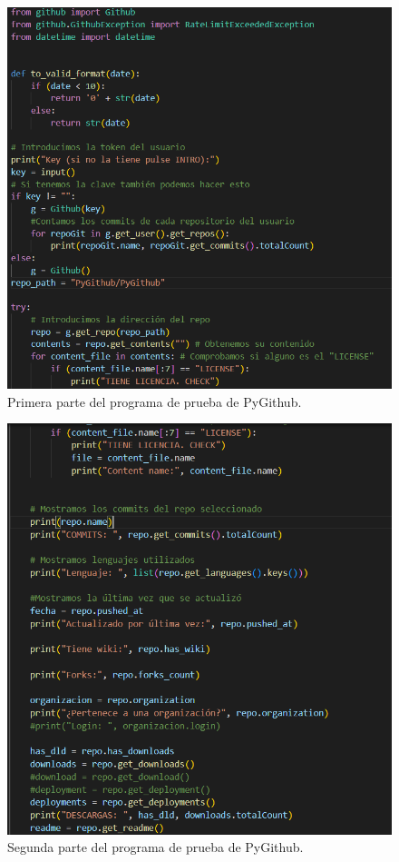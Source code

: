 \documentclass[a4paper, 12pt]{book}
\begin{document}
\begin{figure}
    \centering
    \includegraphics[width=1\textwidth, keepaspectratio]{img/pygithub_1.png}
    \caption{Primera parte del programa de prueba de PyGithub.}\label{fig:pygithub_1}
\end{figure}

\begin{figure}
    \centering
    \includegraphics[width=1\textwidth, keepaspectratio]{img/pygithub_2.png}
    \caption{Segunda parte del programa de prueba de PyGithub.}\label{fig:pygithub_2}
\end{figure}
  
\end{document}

